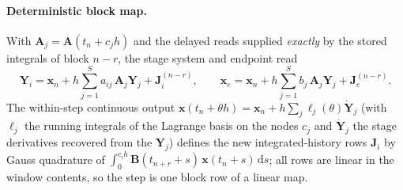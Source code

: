 \documentclass[preprint,12pt]{elsarticle}
\begin{document}
\paragraph{Deterministic block map.} With $\mathbf{A}_j = \mathbf{A}(t_n + c_j h)$ and the delayed reads supplied \emph{exactly} by the stored integrals of block $n-r$, the stage system and endpoint read
\begin{equation}
\mathbf{Y}_i = \mathbf{x}_n + h \sum_{j=1}^S a_{ij}\, \mathbf{A}_j \mathbf{Y}_j + \mathbf{J}^{(n-r)}_i,
\qquad
\mathbf{x}_e = \mathbf{x}_n + h \sum_{j=1}^S b_j\, \mathbf{A}_j \mathbf{Y}_j + \mathbf{J}^{(n-r)}_e .
\end{equation}
The within-step continuous output $\mathbf{x}(t_n + \theta h) = \mathbf{x}_n + h\sum_j \ell_j(\theta) \dot{\mathbf{Y}}_j$ (with $\ell_j$ the running integrals of the Lagrange basis on the nodes $c_j$ and $\dot{\mathbf{Y}}_j$ the stage derivatives recovered from the $\mathbf{Y}_j$) defines the new integrated-history rows $\mathbf{J}_i$ by Gauss quadrature of $\int_0^{c_i h}\mathbf{B}(t_{n+r}+s)\,\mathbf{x}(t_n+s)\,\mathrm{d}s$; all rows are linear in the window contents, so the step is one block row of a linear map.
\end{document}
